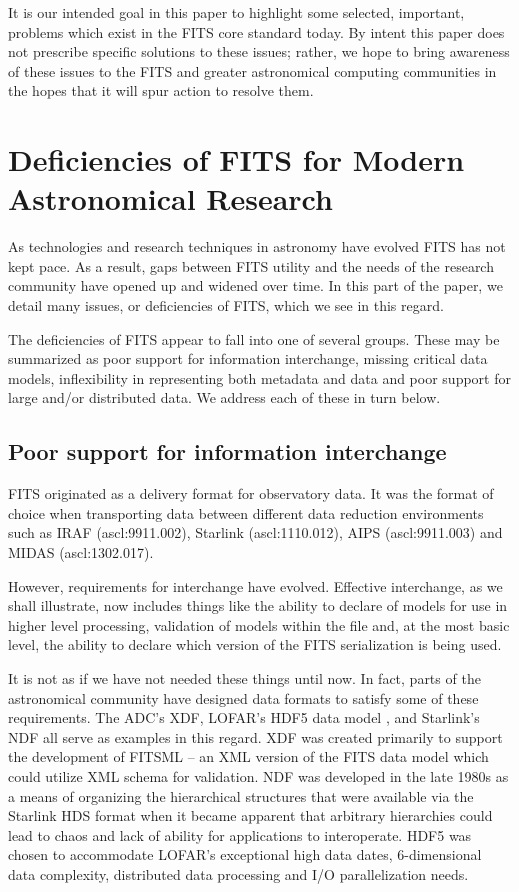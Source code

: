 \documentclass[final,authoryear,5p,times,twocolumn]{elsarticle}
\begin{document}
It is our intended goal in this paper to highlight some selected,
important, problems which exist in the FITS core standard today.
By intent this paper does not prescribe specific solutions to these issues;
rather, we hope to bring awareness of these issues to the FITS and greater
astronomical computing communities in the hopes that
it will spur action to resolve them.

\section{Deficiencies of FITS for Modern Astronomical Research}


As technologies and research techniques in astronomy have evolved FITS
has not kept pace. As a result, gaps between FITS utility and the
needs of the research community have opened up and widened over time. In
this part of the paper, we detail many issues, or deficiencies of FITS,
which we see in this regard.


The deficiencies of FITS appear to fall into one of several
groups. These may be summarized as poor support for information
interchange, missing critical data models, inflexibility in
representing both metadata and data and poor support for large and/or
distributed data. We address each of these in turn below.

\subsection{Poor support for information interchange}

FITS originated as a delivery format for observatory data. It was the
format of choice when transporting data between different data
reduction environments such as IRAF (ascl:9911.002), Starlink
(ascl:1110.012), AIPS (ascl:9911.003) and MIDAS (ascl:1302.017).


However, requirements for interchange have evolved. Effective
interchange, as we shall illustrate, now includes things like the
ability to declare of models for use in higher level processing,
validation of models within the file and, at the most basic level, the
ability to declare which version of the FITS serialization is being
used.


It is not as if we have not needed these things until now. In fact,
parts of the astronomical community have designed data formats to
satisfy some of these requirements. The ADC's XDF, LOFAR's HDF5 data
model \citep{2012ASPC..461..283A}, and Starlink's NDF
\citep{1988STARB...2...11C,1993ASPC...52..229W,P91_adassxxiii} all
serve as examples in this regard. XDF was created primarily to support
the development of FITSML -- an XML version of the FITS data model which
could utilize XML schema for validation. NDF was developed in the late
1980s as a means of organizing the hierarchical structures that were
available via the Starlink HDS format when it became apparent that
arbitrary hierarchies could lead to chaos and lack of ability for
applications to interoperate.  HDF5 was chosen to accommodate LOFAR's
exceptional high data dates, 6-dimensional data complexity, distributed
data processing and I/O parallelization needs.
\end{document}
